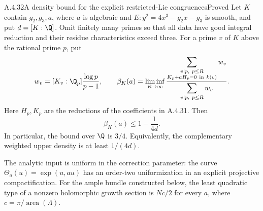 \begin{result}{A.4.32}{A density bound for the explicit restricted-Lie congruences}{Proved}
Let $K$ contain $g_2,g_3,a$, where $a$ is algebraic and
$E:y^2=4x^3-g_2x-g_3$ is smooth, and put $d=[K:\Q]$.
Omit finitely many primes so that all data have good integral
reduction and their residue characteristics exceed three.
For a prime $v$ of $K$ above the rational prime $p$, put
\[
 w_v=[K_v:\Q_p]\frac{\log p}{p-1},\qquad
 \beta_K(a)=\liminf_{R\to\infty}
 \frac{\displaystyle\sum_{\substack{v\mid p,\ p\le R\\
                         K_p+aH_p=0\ {\rm in}\ k(v)}}w_v}
      {\displaystyle\sum_{v\mid p,\ p\le R}w_v}.
\]
Here $H_p,K_p$ are the reductions of the coefficients in A.4.31.
Then
\[
 \boxed{\qquad \beta_K(a)\le 1-\frac1{4d}.\qquad}
\]
In particular, the bound over $\Q$ is $3/4$. Equivalently,
the complementary weighted upper density is at least $1/(4d)$.

The analytic input is uniform in the correction parameter:
the curve $\Theta_a(u)=\exp(u,au)$ has an order-two
uniformization in an explicit projective compactification.
For the ample bundle constructed below, the least quadratic
type of a nonzero holomorphic growth section is $Nc/2$ for
every $a$, where $c=\pi/\operatorname{area}(\Lambda)$.
\end{result}
